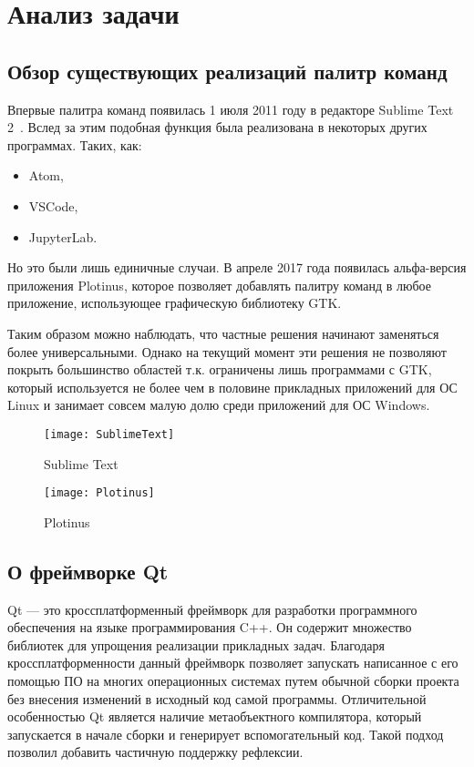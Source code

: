 \chapter{Анализ задачи}

\section{Обзор существующих реализаций палитр команд}\label{analogs}

Впервые палитра команд появилась 1 июля 2011 году в редакторе Sublime Text
2~\cite{sublimetext2changelog}. Вслед за этим подобная функция была реализована
в некоторых других программах. Таких, как:
\begin{itemize}
	\item Atom\cite{atom},
	\item VSCode\cite{vscode},
	\item JupyterLab\cite{jupyterlab}.
\end{itemize}

Но это были лишь единичные случаи. В апреле 2017 года появилась альфа-версия
приложения Plotinus\cite{plotinus}, которое позволяет добавлять палитру команд в
любое приложение, использующее графическую библиотеку GTK.

Таким образом можно наблюдать, что частные решения начинают заменяться более
универсальными. Однако на текущий момент эти решения не позволяют покрыть
большинство областей т.к. ограничены лишь программами с GTK, который
используется не более чем в половине прикладных приложений для ОС Linux и
занимает совсем малую долю среди приложений для ОС Windows.

\begin{figure}[h]
	\centering
	\texttt{[image: SublimeText]}
	\label{sublimetext}
	\caption{Sublime Text}
\end{figure}

\begin{figure}[h]
	\centering
	\texttt{[image: Plotinus]}
	\caption{Plotinus}
\end{figure}

\section{О фреймворке Qt}

Qt — это кроссплатформенный фреймворк для разработки программного обеспечения
на языке программирования C++\cite{qtabout}. Он содержит множество библиотек для
упрощения реализации прикладных задач. Благодаря кроссплатформенности данный
фреймворк позволяет запускать написанное с его помощью ПО на многих операционных
системах путем обычной сборки проекта без внесения изменений в исходный код
самой программы. Отличительной особенностью Qt является наличие метаобъектного
компилятора, который запускается в начале сборки и генерирует
вспомогательный код. Такой подход позволил добавить частичную поддержку
рефлексии.

